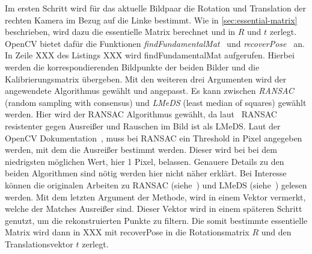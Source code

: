 Im ersten Schritt wird für das aktuelle Bildpaar die Rotation und Translation der rechten Kamera im Bezug auf die Linke bestimmt.
Wie in \cref{sec:essential-matrix} beschrieben, wird dazu die essentielle Matrix berechnet und in $R$ und $t$ zerlegt.
OpenCV bietet dafür die Funktionen \emph{findFundamentalMat}~\cite{opencv_doc_essential_matrix} und \emph{recoverPose}~\cite{opencv_doc_recover_pose} an.
In Zeile XXX des Listings XXX wird findFundamentalMat aufgerufen. 
Hierbei werden die korrespondierenden Bildpunkte der beiden Bilder und die Kalibrierungsmatrix übergeben.
Mit den weiteren drei Argumenten wird der angewendete Algorithmus gewählt und angepasst.
Es kann zwischen \emph{RANSAC} (random sampling with consensus) und \emph{LMeDS} (least median of squares) gewählt werden.
Hier wird der RANSAC Algorithmus gewählt, da laut~\cite[Kapitel 18, 664]{kaehler_2016} RANSAC resistenter gegen Ausreißer und Rauschen im Bild ist als LMeDS. %
Laut der OpenCV Dokumentation~\cite{opencv_doc_essential_matrix}, muss bei RANSAC ein Threshold in Pixel angegeben werden, mit dem die Ausreißer bestimmt werden.
Dieser wird bei bei dem niedrigsten möglichen Wert, hier 1 Pixel, belassen.
Genauere Details zu den beiden Algorithmen sind nötig werden hier nicht näher erklärt.
Bei Interesse können die originalen Arbeiten zu RANSAC (siehe~\cite{fischler_81}) und LMeDS (siehe~\cite{inui_03}) gelesen werden.
Mit dem letzten Argument der Methode, wird in einem Vektor vermerkt, welche der Matches Ausreißer sind.
Dieser Vektor wird in einem späteren Schritt genutzt, um die rekonstruierten Punkte zu filtern.
Die somit bestimmte essentielle Matrix wird dann in XXX mit recoverPose in die Rotationsmatrix $R$ und den Translationsvektor $t$ zerlegt.

